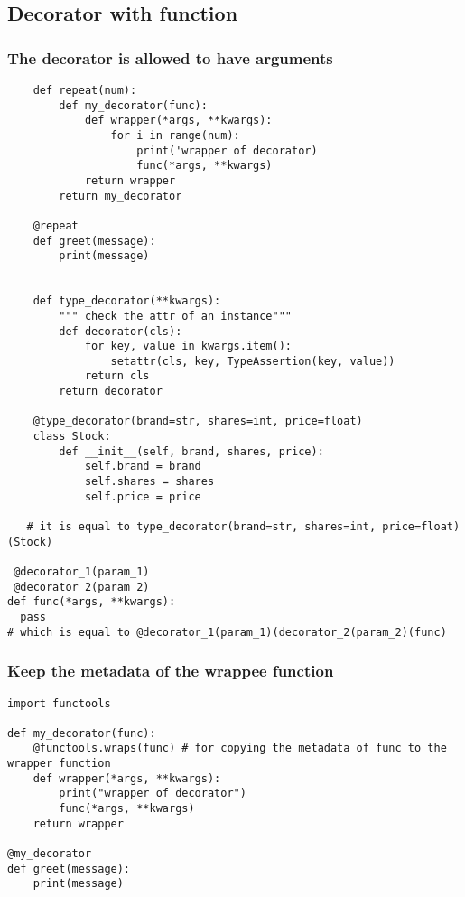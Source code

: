 \documentclass[11pt]{article}
\begin{document}
\subsection{Decorator with function}
\label{sec:orge06b83a}

\subsubsection{The decorator is allowed to have arguments}
\label{sec:orgf7be142}

\begin{verbatim}
    def repeat(num):
        def my_decorator(func):
            def wrapper(*args, **kwargs):
                for i in range(num):
                    print('wrapper of decorator)
                    func(*args, **kwargs)
            return wrapper
        return my_decorator

    @repeat
    def greet(message):
        print(message)


    def type_decorator(**kwargs):
        """ check the attr of an instance"""
        def decorator(cls):
            for key, value in kwargs.item():
                setattr(cls, key, TypeAssertion(key, value))
            return cls
        return decorator

    @type_decorator(brand=str, shares=int, price=float)
    class Stock:
        def __init__(self, brand, shares, price):
            self.brand = brand
            self.shares = shares
            self.price = price

   # it is equal to type_decorator(brand=str, shares=int, price=float)(Stock)

 @decorator_1(param_1)
 @decorator_2(param_2)
def func(*args, **kwargs):
  pass
# which is equal to @decorator_1(param_1)(decorator_2(param_2)(func)                    
\end{verbatim}

\subsubsection{Keep the metadata of the wrappee function}
\label{sec:org4cf8bc7}
\begin{verbatim}
import functools

def my_decorator(func):
    @functools.wraps(func) # for copying the metadata of func to the wrapper function
    def wrapper(*args, **kwargs):
        print("wrapper of decorator")
        func(*args, **kwargs)
    return wrapper

@my_decorator
def greet(message):
    print(message)
\end{verbatim}
\end{document}
